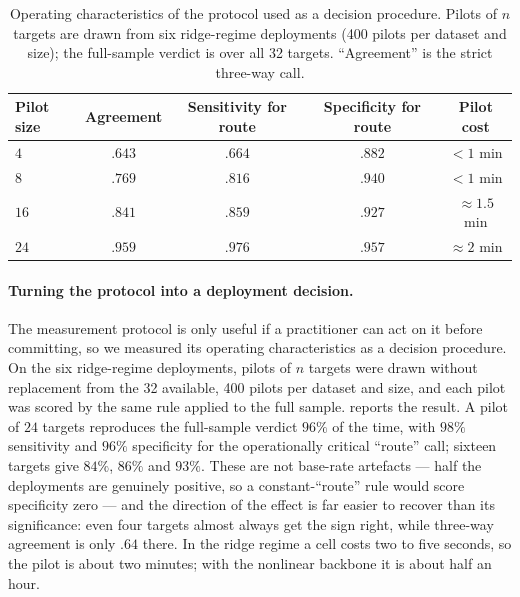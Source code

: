 \begin{table}[t]
 \centering
 \small
 \caption{Operating characteristics of the protocol used as a decision
 procedure. Pilots of $n$ targets are drawn from six ridge-regime deployments
 (400 pilots per dataset and size); the full-sample verdict is over all 32
 targets. ``Agreement'' is the strict three-way call.}
 \label{tab:pilot}
 \begin{tabular}{lcccc}
  \toprule
  Pilot size & Agreement & Sensitivity for route & Specificity for route & Pilot cost\\
  \midrule
  $4$  & $.643$ & $.664$ & $.882$ & $<1$ min\\
  $8$  & $.769$ & $.816$ & $.940$ & $<1$ min\\
  $16$ & $.841$ & $.859$ & $.927$ & $\approx 1.5$ min\\
  $24$ & $\mathbf{.959}$ & $\mathbf{.976}$ & $\mathbf{.957}$ & $\approx 2$ min\\
  \bottomrule \end{tabular}
\end{table}

\paragraph{Turning the protocol into a deployment decision.} The measurement
protocol is only useful if a practitioner can act on it before committing, so we
measured its operating characteristics as a decision procedure. On the six
ridge-regime deployments, pilots of $n$ targets were drawn without replacement
from the 32 available, 400 pilots per dataset and size, and each pilot was
scored by the same rule applied to the full sample.  reports the
result. A pilot of $24$ targets reproduces the full-sample verdict $96\%$ of the
time, with $98\%$ sensitivity and $96\%$ specificity for the operationally
critical ``route'' call; sixteen targets give $84\%$, $86\%$ and $93\%$. These
are not base-rate artefacts --- half the deployments are genuinely positive, so
a constant-``route'' rule would score specificity zero --- and the direction of
the effect is far easier to recover than its significance: even four targets
almost always get the sign right, while three-way agreement is only $.64$ there.
In the ridge regime a cell costs two to five seconds, so the pilot is about two
minutes; with the nonlinear backbone it is about half an hour.

